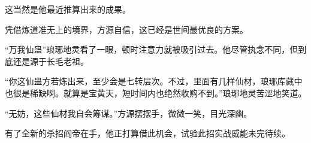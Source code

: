 \begin{this_body}
这当然是他最近推算出来的成果。

凭借炼道准无上的境界，方源自信，这已经是世间最优良的方案。

“万我仙蛊”琅琊地灵看了一眼，顿时注意力就被吸引过去。他尽管执念不同，但到底还是源于长毛老祖。

“你这仙蛊方若炼出来，至少会是七转层次。不过，里面有几样仙材，琅琊库藏中也很是稀缺啊。就算是宝黄天，短时间内也绝然收购不到。”琅琊地灵苦涩地笑道。

“无妨，这些仙材我自会筹谋。”方源摆摆手，微微一笑，目光深幽。

有了全新的杀招阎帝在手，他正打算借此机会，试验此招实战威能未完待续。

\end{this_body}

